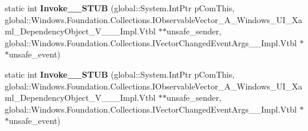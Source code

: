 \begin{DoxyCompactItemize}
\item 
\mbox{\label{struct_windows_1_1_foundation_1_1_collections_1_1_vector_changed_event_handler___a___windows___ube91dabf53d084dfd6eb7cefa21564f8_a00298722ea53c14683efe7ca8eaa54ac}} 
static int {\bfseries Invoke\+\_\+\+\_\+\+S\+T\+UB} (global\+::\+System.\+Int\+Ptr p\+Com\+This, global\+::\+Windows.\+Foundation.\+Collections.\+I\+Observable\+Vector\+\_\+\+A\+\_\+\+Windows\+\_\+\+U\+I\+\_\+\+Xaml\+\_\+\+Dependency\+Object\+\_\+\+V\+\_\+\+\_\+\+\_\+\+Impl.\+Vtbl $\ast$$\ast$unsafe\+\_\+sender, global\+::\+Windows.\+Foundation.\+Collections.\+I\+Vector\+Changed\+Event\+Args\+\_\+\+\_\+\+Impl.\+Vtbl $\ast$$\ast$unsafe\+\_\+event)
\item 
\mbox{\label{struct_windows_1_1_foundation_1_1_collections_1_1_vector_changed_event_handler___a___windows___ube91dabf53d084dfd6eb7cefa21564f8_a00298722ea53c14683efe7ca8eaa54ac}} 
static int {\bfseries Invoke\+\_\+\+\_\+\+S\+T\+UB} (global\+::\+System.\+Int\+Ptr p\+Com\+This, global\+::\+Windows.\+Foundation.\+Collections.\+I\+Observable\+Vector\+\_\+\+A\+\_\+\+Windows\+\_\+\+U\+I\+\_\+\+Xaml\+\_\+\+Dependency\+Object\+\_\+\+V\+\_\+\+\_\+\+\_\+\+Impl.\+Vtbl $\ast$$\ast$unsafe\+\_\+sender, global\+::\+Windows.\+Foundation.\+Collections.\+I\+Vector\+Changed\+Event\+Args\+\_\+\+\_\+\+Impl.\+Vtbl $\ast$$\ast$unsafe\+\_\+event)
\end{DoxyCompactItemize}
